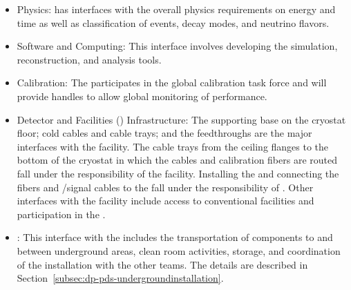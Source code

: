 \begin{itemize}
\item \dune Physics: \dual {} has interfaces with the overall physics requirements on energy and time as well as classification of events, decay modes, and neutrino flavors.

\item Software and Computing: This interface involves developing the simulation, reconstruction, and analysis tools.

\item Calibration: The  participates in the  global calibration task force and will provide handles to allow global monitoring of  performance.


\item Detector and Facilities () Infrastructure: The 
 supporting base on the cryostat floor; cold cables and cable trays; and the feedthroughs are the major interfaces with the facility. The cable trays from the ceiling \fdth flanges to the bottom of the cryostat in which the cables and calibration fibers are routed fall under the responsibility of the facility. Installing the  and connecting the fibers and /signal cables to the  fall under the responsibility of . Other interfaces with the facility include access to conventional facilities and participation in the .

\item {}: This interface with the  includes the transportation of  components to and between underground areas, clean room activities, storage, and coordination of the installation with the other teams. The details are described in Section~\ref{subsec:dp-pds-undergroundinstallation}.

\end{itemize}

